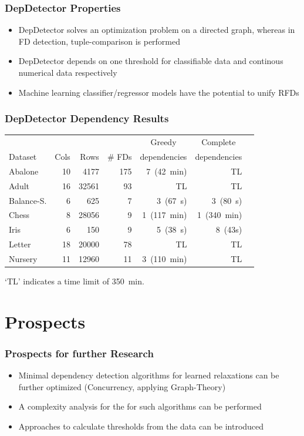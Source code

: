 \documentclass{beamer}
\begin{document}
\begin{frame}
    \frametitle{DepDetector Properties}
    \begin{itemize}
        \item DepDetector solves an optimization problem on a directed graph, whereas in FD detection, tuple-comparison is performed
        \item DepDetector depends on one threshold for classifiable data and continous numerical data respectively
        \item Machine learning classifier/regressor models have the potential to unify RFDs
    \end{itemize}
\end{frame}

\begin{frame}
    \frametitle{DepDetector Dependency Results}
    \begin{table}[ht]
        \centering
        \begin{tabular}{lrrrrrr}
            \toprule
            \toprule
            & & & & \multicolumn{1}{c}{Greedy} & \multicolumn{1}{c}{Complete} \\
            Dataset & Cols & Rows & \# FDs & dependencies & dependencies \\
            \midrule
            Abalone & 10 & 4177 & 175 & 7~(42~min) & TL \\
            Adult & 16 & 32561 & 93 & TL & TL \\
            Balance-S. & 6 & 625 & 7 & 3~(67~s) & 3~(80~s) \\
            Chess & 8 & 28056 & 9 & 1~(117~min) & 1~(340~min) \\
            Iris & 6 & 150 & 9 & 5~(38~s) & 8~(43s) \\
            Letter & 18 & 20000 & 78 & TL & TL \\
            Nursery & 11 & 12960 & 11 & 3~(110~min) & TL \\
            \bottomrule
            \bottomrule
        \end{tabular}
    \end{table}
`TL' indicates a time limit of 350~min.
\end{frame}

\section{Prospects}
\begin{frame}
    \frametitle{Prospects for further Research}
    \begin{itemize}
        \item Minimal dependency detection algorithms for learned relaxations can be further optimized (Concurrency, applying Graph-Theory)
        \item A complexity analysis for the for such algorithms can be performed
        \item Approaches to calculate thresholds from the data can be introduced
    \end{itemize}
\end{frame}
\end{document}
